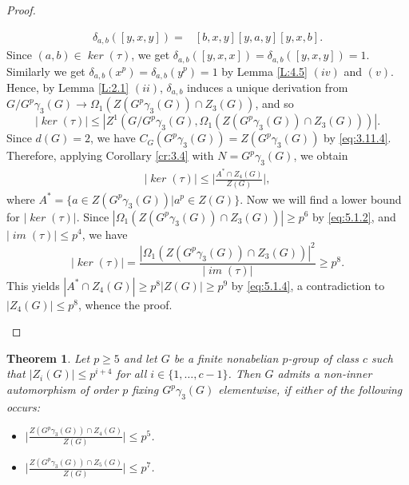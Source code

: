 \documentclass[preprint,sort&compress,12pt]{elsarticle}
\newtheorem{theorem}{Theorem}[section]
\theoremstyle{definition}
\numberwithin{equation}{theorem}
\DeclareMathOperator{\Ker}{\mathit{ker}}
\DeclareMathOperator{\im}{\mathit{im}}
\begin{document}
\begin{proof}
\begin{itemize}
\begin{align*}
\delta_{a, b}([y, x, y])= &[b, x, y][y, a, y][y, x, b].
\end{align*}
\noindent Since $(a, b)\in \Ker(\tau)$, we get $\delta_{a, b}([y, x, x])=\delta_{a, b}([y, x, y])=1$. Similarly we get $\delta_{a, b}(x^p)=\delta_{a, b}(y^p)=1$ by Lemma \ref{L:4.5} $(iv)$ and $(v)$. Hence, by Lemma \ref{L:2.1} $(ii)$, $\delta_{a, b}$ induces a unique derivation from $G/G^p\gamma_3(G)\rightarrow \Omega_1(Z(G^p\gamma_3(G))\cap Z_3(G))$, and so
\begin{equation*}
|\Ker(\tau)|\le |Z^1(G/G^p\gamma_3(G), \Omega_1(Z(G^p\gamma_3(G))\cap Z_3(G)))|.
\end{equation*}
Since $d(G)=2$, we have $C_G(G^p\gamma_3(G))= Z(G^p\gamma_3(G))$ by \eqref{eq:3.11.4}. Therefore, applying Corollary \ref{cr:3.4} with $N= G^p\gamma_3(G)$, we obtain
\begin{align}\label{eq:5.1.4}
|\Ker (\tau)|\le \bigg|\frac{A^*\cap Z_4(G)}{Z(G)}\bigg|,
\end{align}
\noindent where $A^*= \{a\in Z(G^p\gamma_3(G))| a^p\in Z(G)\}$. Now we will find a lower bound for $|\Ker(\tau)|$. Since $|\Omega_1(Z(G^p\gamma_3(G))\cap Z_3(G))|\ge p^6$ by \eqref{eq:5.1.2}, and $|\im(\tau)|\le p^4$, we have
\begin{equation*}
|\Ker(\tau)|= \frac{|\Omega_1(Z(G^p\gamma_3(G))\cap Z_3(G))|^2}{|\im(\tau)|}\ge p^8.
\end{equation*}
\noindent This yields $|A^*\cap Z_4(G)|\ge p^8|Z(G)|\ge p^9$ by \eqref{eq:5.1.4}, a contradiction to $|Z_4(G)|\le p^8$, whence the proof.
\end{itemize}
\end{proof}

\begin{theorem}\label{th:5.2}
Let $p\ge 5$ and let $G$ be a finite nonabelian $p$-group of class $c$ such that $|Z_i(G)|\le p^{i+4}$ for all $i\in \{1, \ldots, c-1\}$. Then $G$ admits a non-inner automorphism of order $p$ fixing $G^p\gamma_3(G)$ elementwise, if either of the following occurs:
\begin{itemize}
\item [$(i)$] $\bigg|\frac{Z(G^p\gamma_3(G))\cap Z_4(G)}{Z(G)}\bigg|\le p^5$.
\item [$(ii)$] $\bigg|\frac{Z(G^p\gamma_3(G))\cap Z_5(G)}{Z(G)}\bigg|\le p^7$.
\end{itemize}
\end{theorem}
\end{document}
